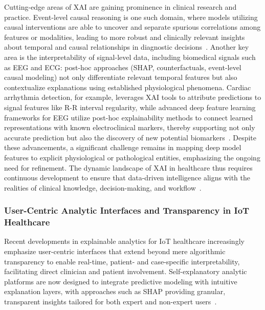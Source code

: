 \documentclass[sigconf]{acmart}
\begin{document}
Cutting-edge areas of XAI are gaining prominence in clinical research and practice. Event-level causal reasoning is one such domain, where models utilizing causal interventions are able to uncover and separate spurious correlations among features or modalities, leading to more robust and clinically relevant insights about temporal and causal relationships in diagnostic decisions~\cite{ref32,ref36,ref39}. Another key area is the interpretability of signal-level data, including biomedical signals such as EEG and ECG: post-hoc approaches (SHAP, counterfactuals, event-level causal modeling) not only differentiate relevant temporal features but also contextualize explanations using established physiological phenomena. Cardiac arrhythmia detection, for example, leverages XAI tools to attribute predictions to signal features like R-R interval regularity, while advanced deep feature learning frameworks for EEG utilize post-hoc explainability methods to connect learned representations with known electroclinical markers, thereby supporting not only accurate prediction but also the discovery of new potential biomarkers~\cite{ref68,ref98,ref99}. Despite these advancements, a significant challenge remains in mapping deep model features to explicit physiological or pathological entities, emphasizing the ongoing need for refinement. The dynamic landscape of XAI in healthcare thus requires continuous development to ensure that data-driven intelligence aligns with the realities of clinical knowledge, decision-making, and workflow~\cite{ref98,ref99}.

\subsubsection{User-Centric Analytic Interfaces and Transparency in IoT Healthcare}

Recent developments in explainable analytics for IoT healthcare increasingly emphasize user-centric interfaces that extend beyond mere algorithmic transparency to enable real-time, patient- and case-specific interpretability, facilitating direct clinician and patient involvement. Self-explanatory analytic platforms are now designed to integrate predictive modeling with intuitive explanation layers, with approaches such as SHAP providing granular, transparent insights tailored for both expert and non-expert users~\cite{ref87,ref89,ref99,ref106}.
\end{document}
